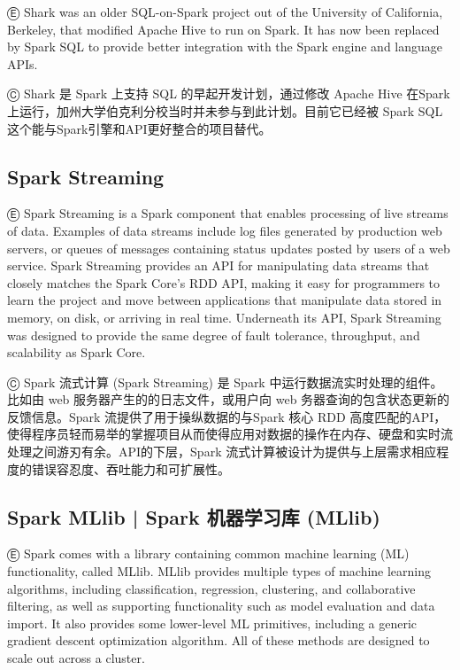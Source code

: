 Ⓔ \textcolor{etc}{Shark was an older SQL-on-Spark project out of the University of California, Berkeley, that modified Apache Hive to run on Spark. It has now been replaced by Spark SQL to provide better integration with the Spark engine and language APIs.}

Ⓒ Shark 是 Spark 上支持 SQL 的早起开发计划，通过修改 Apache Hive 在Spark上运行，加州大学伯克利分校当时并未参与到此计划。目前它已经被 Spark SQL 这个能与Spark引擎和API更好整合的项目替代。

\subsection{Spark Streaming}\label{spark-streaming}

Ⓔ \textcolor{etc}{Spark Streaming is a Spark component that enables processing of live streams of data. Examples of data streams include log files generated by production web servers, or queues of messages containing status updates posted by users of a web service. Spark Streaming provides an API for manipulating data streams that closely matches the Spark Core's RDD API, making it easy for programmers to learn the project and move between applications that manipulate data stored in memory, on disk, or arriving in real time. Underneath its API, Spark Streaming was designed to provide the same degree of fault tolerance, throughput, and scalability as Spark Core.}

Ⓒ Spark 流式计算 (Spark Streaming) 是 Spark 中运行数据流实时处理的组件。比如由 web 服务器产生的的日志文件，或用户向 web 务器查询的包含状态更新的反馈信息。Spark 流提供了用于操纵数据的与Spark 核心 RDD 高度匹配的API，使得程序员轻而易举的掌握项目从而使得应用对数据的操作在内存、硬盘和实时流处理之间游刃有余。API的下层，Spark 流式计算被设计为提供与上层需求相应程度的错误容忍度、吞吐能力和可扩展性。

\subsection{Spark MLlib  |  Spark 机器学习库 (MLlib)}\label{spark-mllib}

Ⓔ \textcolor{etc}{Spark comes with a library containing common machine learning (ML) functionality, called MLlib. MLlib provides multiple types of machine learning algorithms, including classification, regression, clustering, and collaborative filtering, as well as supporting functionality such as model evaluation and data import. It also provides some lower-level ML primitives, including a generic gradient descent optimization algorithm. All of these methods are designed to scale out across a cluster.}

